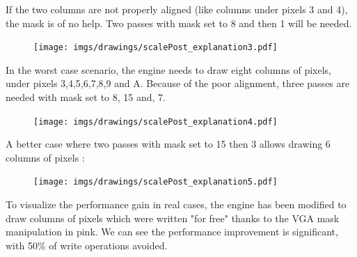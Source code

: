 \label{simd_vga}
If the two columns are not properly aligned (like columns under pixels 3 and 4), the mask is of no help. Two passes with mask set to 8 and then 1 will be needed.\\
 \par
 \begin{minipage}{\textwidth}

\end{minipage}
\par
  \begin{figure}[H]
 \centering
 \texttt{[image: imgs/drawings/scalePost\_explanation3.pdf]}
 \end{figure}


In the worst case scenario, the engine needs to draw eight columns of pixels, under pixels 3,4,5,6,7,8,9 and A. Because of the poor alignment, three passes are needed with mask set to 8, 15 and, 7.\\
 \par
 \begin{minipage}{\textwidth}

\end{minipage}
\par
  \begin{figure}[H]
 \centering
 \texttt{[image: imgs/drawings/scalePost\_explanation4.pdf]}
 \end{figure}


A better case where two passes with mask set to 15 then 3 allows drawing 6 columns of pixels :\\
 \par
 \begin{minipage}{\textwidth}

\end{minipage}
\par
   \begin{figure}[H]
 \centering
 \texttt{[image: imgs/drawings/scalePost\_explanation5.pdf]}
  
 \end{figure}






To visualize the performance gain in real cases, the engine has been modified to draw columns of pixels which were written "for free" thanks to the VGA mask manipulation in pink. We can see the performance improvement is significant, with 50\% of write operations avoided.

\begin{minipage}{\textwidth}
 \centering
\vspace*{0.5cm}\\

\end{minipage}



